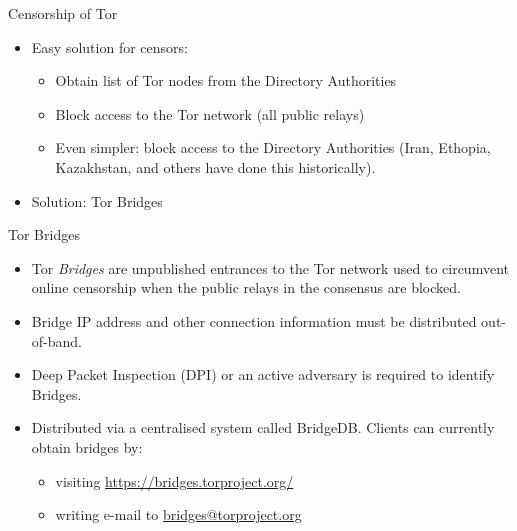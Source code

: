 \documentclass[9pt,a4paper,handout]{beamer}
\begin{document}
\begin{frame}{Censorship of Tor}
  \begin{itemize}
    \item Easy solution for censors: 
      \begin{itemize}
        \item<2-> Obtain list of Tor nodes from the Directory Authorities
        \item<3-> Block access to the Tor network (all public relays)
        \item<4-> Even simpler: block access to the Directory Authorities (Iran, Ethopia, Kazakhstan,
          and others have done this historically).
      \end{itemize}
    \item<5-> Solution: Tor Bridges
  \end{itemize}
\end{frame}


\begin{frame}{Tor Bridges}
  \begin{itemize}
    \item<1-> Tor \emph{Bridges} are unpublished entrances to the Tor network used to circumvent
      online censorship when the public relays in the consensus are blocked.
    \item<2-> Bridge IP address and other connection information must be distributed out-of-band.
    \item<3-> Deep Packet Inspection (DPI) or an active adversary is required to identify Bridges.
    \item<4-> Distributed via a centralised system called BridgeDB. Clients can currently obtain
      bridges by:
      \begin{itemize}
        \item visiting \url{https://bridges.torproject.org/}
        \item writing e-mail to \href{mailto:bridges@torproject.org}{bridges@torproject.org}
      \end{itemize}
  \end{itemize}

\end{frame}
\end{document}
